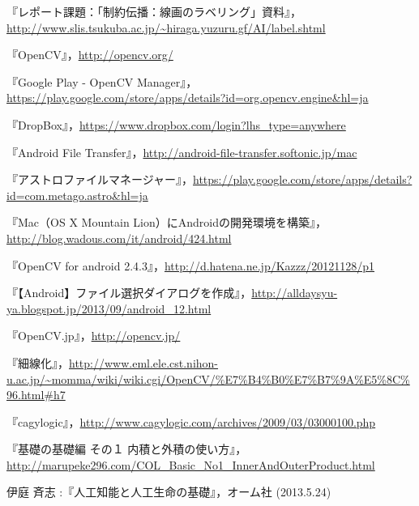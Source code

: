 \documentclass{jarticle}
\begin{document}
\begin{thebibliography}{n}
『レポート課題：「制約伝播：線画のラベリング」資料』，\url{http://www.slis.tsukuba.ac.jp/~hiraga.yuzuru.gf/AI/label.shtml}

『OpenCV』，\url{http://opencv.org/}

『Google Play - OpenCV Manager』，\url{https://play.google.com/store/apps/details?id=org.opencv.engine&hl=ja}

『DropBox』，\url{https://www.dropbox.com/login?lhs_type=anywhere}

『Android File Transfer』，\url{http://android-file-transfer.softonic.jp/mac}

『アストロファイルマネージャー』，\url{https://play.google.com/store/apps/details?id=com.metago.astro&hl=ja}

『Mac（OS X Mountain Lion）にAndroidの開発環境を構築』，\url{http://blog.wadous.com/it/android/424.html}

『OpenCV for android 2.4.3』，\url{http://d.hatena.ne.jp/Kazzz/20121128/p1}

『【Android】ファイル選択ダイアログを作成』，\url{http://alldaysyu-ya.blogspot.jp/2013/09/android_12.html}

『OpenCV.jp』，\url{http://opencv.jp/}

『細線化』，\url{http://www.eml.ele.cst.nihon-u.ac.jp/~momma/wiki/wiki.cgi/OpenCV/%E7%B4%B0%E7%B7%9A%E5%8C%96.html#h7}

『cagylogic』，\url{http://www.cagylogic.com/archives/2009/03/03000100.php}

『基礎の基礎編 その１ 内積と外積の使い方』，\url{http://marupeke296.com/COL_Basic_No1_InnerAndOuterProduct.html}

伊庭 斉志 :『人工知能と人工生命の基礎』，オーム社 (2013.5.24)


\end{thebibliography}
\end{document}
